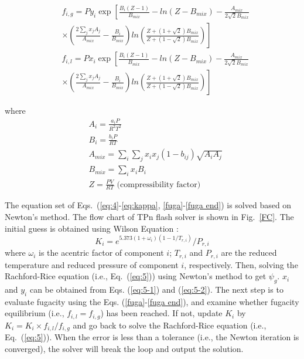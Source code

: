 {    \begin{align}
         & f_{i,g}=P y_i \exp \left[\frac{B_i(Z - 1)}{B_{mix}} - ln(Z-B_{mix})- \frac{A_{mix}} {2\sqrt{2} B_{mix}} \right. \nonumber\label{fuga}                                                \\
         & \left.\times\left(\frac{2 \sum_j {x_j A_j} } {A_{mix}} - \frac {B_i} {B_{mix}}\right) ln\left(\frac{Z + (1+\sqrt{2})B_{mix}} { Z + (1-\sqrt{2}) B_{mix}}\right)\right]                \\
         & f_{i,l}=P x_i \exp \left[\frac{B_i(Z - 1)}{B_{mix}} - ln(Z-B_{mix})- \frac{A_{mix}} {2\sqrt{2} B_{mix}}  \right. \nonumber                                                            \\
         & \left.\times \left(\frac{2 \sum_j {x_j A_j} } {A_{mix}} - \frac {B_i} {B_{mix}}\right) ln\left(\frac{Z + (1+\sqrt{2})B_{mix}} { Z + (1-\sqrt{2}) B_{mix}}\right)\right]  
    \end{align}

    where
    \begin{align}
         & A_i=\frac{a_i P}{R^2T^2} \label{fuga 1}                           \\
         & B_i=\frac{b_i P}{RT}                                              \\
         & A_{mix}=\sum_i\sum_jx_ix_j(1-b_{ij})\sqrt{A_iA_j}                 \\
         & B_{mix}=\sum_ix_i B_i                                             \\
         & Z=\frac{PV}{RT}\text{ (compressibility factor)}  \label{fuga end}
    \end{align}

    The equation set of Eqs.~(\ref{eq:4}-\ref{eq:kappa}, \ref{fuga}-\ref{fuga end}) is solved based on Newton's method. The flow chart of TPn flash solver is shown in Fig.~\ref{FC}. The initial guess is obtained using Wilson Equation \citep{wilson1964vapor}:
    \begin{equation}
        K_i=e^{5.373(1+\omega_i)(1-1/T_{r,i})}/P_{r,i}
    \end{equation}
    where $\omega_i$ is the acentric factor of component $i$; $T_{r,i}$ and $P_{r,i}$ are the reduced temperature and reduced pressure of component $i$, respectively.
    Then, solving the Rachford-Rice equation (i.e., Eq.~(\ref{eq:5})) using Newton's method to get $\psi_g$. $x_i$ and $y_i$ can be obtained from Eqs. (\ref{eq:5-1}) and (\ref{eq:5-2}). The next step is to evaluate fugacity using the Eqs. (\ref{fuga}-\ref{fuga end}), and examine whether fugacity equilibrium (i.e., $f_{i,l}=f_{i,g}$) has been reached. If not, update $K_i$ by $K_i=K_i \times f_{i,l}/f_{i,g}$ and go back to solve the Rachford-Rice equation (i.e., Eq.~(\ref{eq:5})). When the error is less than a tolerance (i.e., the Newton iteration is converged), the solver will break the loop and output the solution.

}
